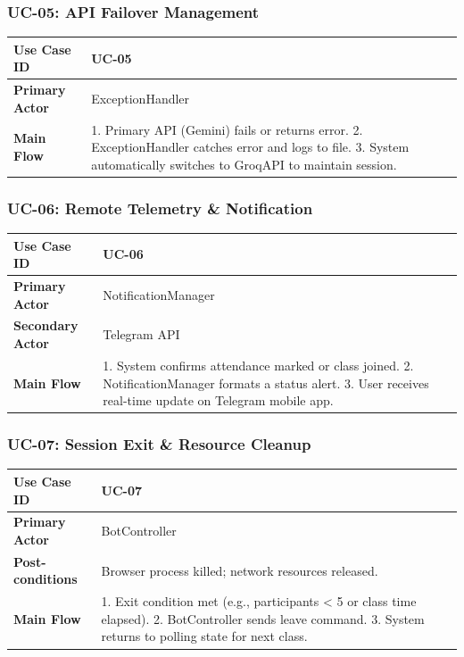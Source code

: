 \documentclass[12pt]{article}
\begin{document}
\subsubsection{UC-05: API Failover Management}
\begin{longtable}{|p{4cm}|p{10cm}|}
\hline
\textbf{Use Case ID} & UC-05 \\ \hline
\textbf{Primary Actor} & ExceptionHandler \\ \hline
\textbf{Main Flow} & 1. Primary API (Gemini) fails or returns error. 2. ExceptionHandler catches error and logs to file. 3. System automatically switches to GroqAPI to maintain session. \\ \hline
\end{longtable}

\subsubsection{UC-06: Remote Telemetry \& Notification}
\begin{longtable}{|p{4cm}|p{10cm}|}
\hline
\textbf{Use Case ID} & UC-06 \\ \hline
\textbf{Primary Actor} & NotificationManager \\ \hline
\textbf{Secondary Actor} & Telegram API \\ \hline
\textbf{Main Flow} & 1. System confirms attendance marked or class joined. 2. NotificationManager formats a status alert. 3. User receives real-time update on Telegram mobile app. \\ \hline
\end{longtable}

\subsubsection{UC-07: Session Exit \& Resource Cleanup}
\begin{longtable}{|p{4cm}|p{10cm}|}
\hline
\textbf{Use Case ID} & UC-07 \\ \hline
\textbf{Primary Actor} & BotController \\ \hline
\textbf{Post-conditions} & Browser process killed; network resources released. \\ \hline
\textbf{Main Flow} & 1. Exit condition met (e.g., participants < 5 or class time elapsed). 2. BotController sends leave command. 3. System returns to polling state for next class. \\ \hline
\end{longtable}
\end{document}
